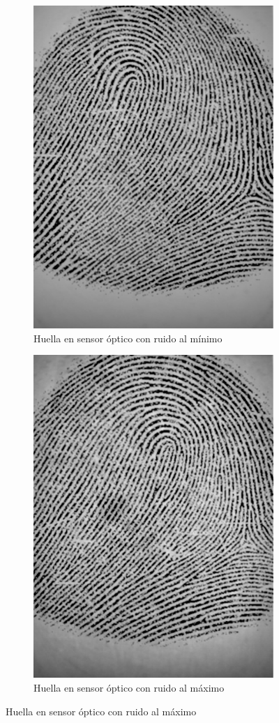 \documentclass[10pt,a4paper]{article}
\begin{document}
\begin{figure}[h!]
\begin{subfigure}{.5\textwidth}
  \centering
  \includegraphics[width=.7\linewidth]{1.3/optical_min.png}
  \caption{Huella en sensor óptico con ruido al mínimo}
  \label{fig:opt_min}
\end{subfigure}%
\begin{subfigure}{.5\textwidth}
  \centering
  \includegraphics[width=.7\linewidth]{1.3/optical_max.png}
  \caption{Huella en sensor óptico con ruido al máximo}
  \label{fig:opt_max}
\end{subfigure}
\end{figure}
\end{document}
